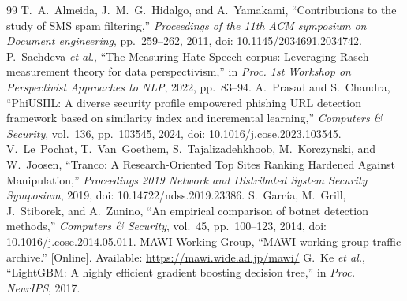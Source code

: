 \begin{thebibliography}{99}
 T.~A.~Almeida, J.~M.~G.~Hidalgo, and A.~Yamakami, ``Contributions to the study of SMS spam filtering,'' \emph{Proceedings of the 11th ACM symposium on Document engineering}, pp.~259--262, 2011, doi: 10.1145/2034691.2034742.
 P.~Sachdeva \emph{et al.}, ``The Measuring Hate Speech corpus: Leveraging Rasch measurement theory for data perspectivism,'' in \emph{Proc. 1st Workshop on Perspectivist Approaches to NLP}, 2022, pp.~83--94.
 A.~Prasad and S.~Chandra, ``PhiUSIIL: A diverse security profile empowered phishing URL detection framework based on similarity index and incremental learning,'' \emph{Computers \& Security}, vol.~136, pp.~103545, 2024, doi: 10.1016/j.cose.2023.103545.
 V.~Le~Pochat, T.~Van~Goethem, S.~Tajalizadehkhoob, M.~Korczynski, and W.~Joosen, ``Tranco: A Research-Oriented Top Sites Ranking Hardened Against Manipulation,'' \emph{Proceedings 2019 Network and Distributed System Security Symposium}, 2019, doi: 10.14722/ndss.2019.23386.
 S.~García, M.~Grill, J.~Stiborek, and A.~Zunino, ``An empirical comparison of botnet detection methods,'' \emph{Computers \& Security}, vol.~45, pp.~100--123, 2014, doi: 10.1016/j.cose.2014.05.011.
 MAWI Working Group, ``MAWI working group traffic archive.'' [Online]. Available: \url{https://mawi.wide.ad.jp/mawi/}
 G.~Ke \emph{et al.}, ``LightGBM: A highly efficient gradient boosting decision tree,'' in \emph{Proc. NeurIPS}, 2017.
\end{thebibliography}
